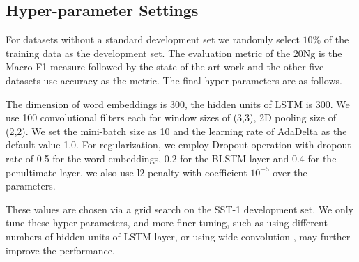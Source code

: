 \documentclass[11pt]{article}
\begin{document}
\subsection{Hyper-parameter Settings}
\label{hyper-parameter}
For datasets without a standard development set we randomly select $10\%$ of the training data as the development set. The evaluation metric of the 20Ng is the Macro-F1 measure followed by the state-of-the-art work and the other five datasets use accuracy as the metric. 
The final hyper-parameters are as follows. 

The dimension of word embeddings is 300, the hidden units of LSTM is 300. We use 100 convolutional filters each for window sizes of (3,3), 2D pooling size of (2,2). We set the mini-batch size as 10 and the learning rate of AdaDelta as the default value 1.0.
For regularization, we employ Dropout operation \cite{hinton2012improving} with dropout rate of 0.5 for the word embeddings, 0.2 for the  BLSTM layer and 0.4 for the penultimate layer, we also use l2 penalty with coefficient $10^{-5}$ over the parameters.


These values are chosen via a grid search on the SST-1 development set. We only tune these hyper-parameters, and more finer tuning, such as using different numbers of hidden units of LSTM layer, or using wide convolution \cite{kalchbrenner2014convolutional}, may further improve the performance.
\end{document}
